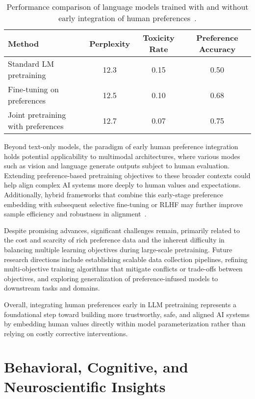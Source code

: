 \documentclass[sigconf]{acmart}
\begin{document}
\begin{table*}[htbp]
\centering
\caption{Performance comparison of language models trained with and without early integration of human preferences~\cite{ref41}.}
\label{tab:pref_results}
\begin{adjustbox}{max width=\textwidth}
\begin{tabular}{@{}lccc@{}}
\toprule
Method & Perplexity & Toxicity Rate & Preference Accuracy \\
\midrule
Standard LM pretraining & 12.3 & 0.15 & 0.50 \\
Fine-tuning on preferences & 12.5 & 0.10 & 0.68 \\
Joint pretraining with preferences & 12.7 & 0.07 & 0.75 \\
\bottomrule
\end{tabular}
\end{adjustbox}
\end{table*}

Beyond text-only models, the paradigm of early human preference integration holds potential applicability to multimodal architectures, where various modes such as vision and language generate outputs subject to human evaluation. Extending preference-based pretraining objectives to these broader contexts could help align complex AI systems more deeply to human values and expectations. Additionally, hybrid frameworks that combine this early-stage preference embedding with subsequent selective fine-tuning or RLHF may further improve sample efficiency and robustness in alignment~\cite{ref41}.

Despite promising advances, significant challenges remain, primarily related to the cost and scarcity of rich preference data and the inherent difficulty in balancing multiple learning objectives during large-scale pretraining. Future research directions include establishing scalable data collection pipelines, refining multi-objective training algorithms that mitigate conflicts or trade-offs between objectives, and exploring generalization of preference-infused models to downstream tasks and domains.

Overall, integrating human preferences early in LLM pretraining represents a foundational step toward building more trustworthy, safe, and aligned AI systems by embedding human values directly within model parameterization rather than relying on costly corrective interventions.

\section{Behavioral, Cognitive, and Neuroscientific Insights}
\end{document}
